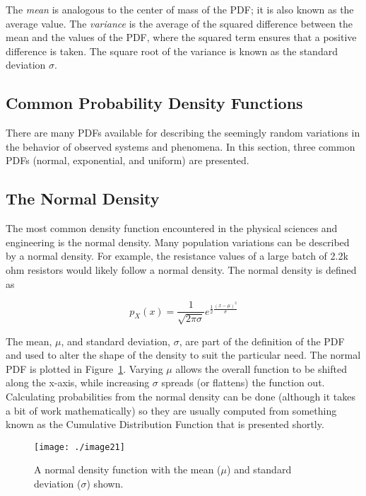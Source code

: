 {The \emph{mean} is analogous to the center of mass of the PDF; it is
also known as the average value. The \emph{variance} is the average of
the squared difference between the mean and the values of the PDF, where
the squared term ensures that a positive difference is taken. The square
root of the variance is known as the standard deviation $\sigma$.

\subsection{Common Probability Density Functions}
\label{subsection:common-probability-density-functions}

There are many PDFs available for describing the seemingly random
variations in the behavior of observed systems and phenomena. In this
section, three common PDFs (normal, exponential, and uniform) are
presented.

\subsection*{The Normal Density}
\label{subsection:the-normal-density}


The most common density function encountered in the physical sciences
and engineering is the normal density. Many population
variations can be described by a normal density. For example, the
resistance values of a large batch of 2.2k ohm resistors would likely
follow a normal density. The normal density is defined as

\begin{equation}
\label{equ:normalDensity}
p_X(x) = \frac{1}{\sqrt{2\pi\sigma}} e^{\frac{1}{2} \frac{(x-\mu)^2}{\sigma}}
\end{equation}

The mean, $\mu$, and standard deviation, $\sigma$, are part of the
definition of the PDF and used to alter the shape of the density to suit
the particular need. The normal PDF is plotted in 
Figure~\ref{figure:normalDensityFunction}. Varying
$\mu$ allows the overall function to be shifted along the x-axis,
while increasing $\sigma$ spreads (or flattens) the function out.
Calculating probabilities from the normal density can be done (although
it takes a bit of work mathematically) so they are usually computed from
something known as the Cumulative Distribution Function that is
presented shortly.

\begin{figure}[h]
\centering
\texttt{[image: ./image21]}
\caption{A normal density function with the mean ($\mu$)
and standard deviation ($\sigma$) shown.}
\label{figure:normalDensityFunction}
\end{figure}


}
